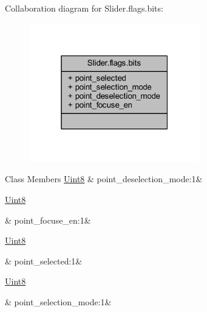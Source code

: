 Collaboration diagram for Slider.\+flags.\+bits\+:
\nopagebreak
\begin{figure}[H]
\begin{center}
\leavevmode
\includegraphics[width=211pt]{d0/d48/a00351}
\end{center}
\end{figure}
\begin{DoxyFields}{Class Members}
\hypertarget{a00078_a73ac9a976343cc1d8842ecd1bc1b2746}{\hyperlink{a00004_a979e3e23b9a449e69ab6a8a83b6042f8}{Uint8}}\label{a00078_a73ac9a976343cc1d8842ecd1bc1b2746}
&
point\+\_\+deselection\+\_\+mode\+:1&
\\
\hline

\hypertarget{a00078_aeae313367aca4002d5be6284009fd26a}{\hyperlink{a00004_a979e3e23b9a449e69ab6a8a83b6042f8}{Uint8}}\label{a00078_aeae313367aca4002d5be6284009fd26a}
&
point\+\_\+focuse\+\_\+en\+:1&
\\
\hline

\hypertarget{a00078_a6f35b78941cb8dc08585d215b05befa2}{\hyperlink{a00004_a979e3e23b9a449e69ab6a8a83b6042f8}{Uint8}}\label{a00078_a6f35b78941cb8dc08585d215b05befa2}
&
point\+\_\+selected\+:1&
\\
\hline

\hypertarget{a00078_a11d4438dc576a131ad6ca02f09621f1d}{\hyperlink{a00004_a979e3e23b9a449e69ab6a8a83b6042f8}{Uint8}}\label{a00078_a11d4438dc576a131ad6ca02f09621f1d}
&
point\+\_\+selection\+\_\+mode\+:1&
\\
\hline

\end{DoxyFields}


